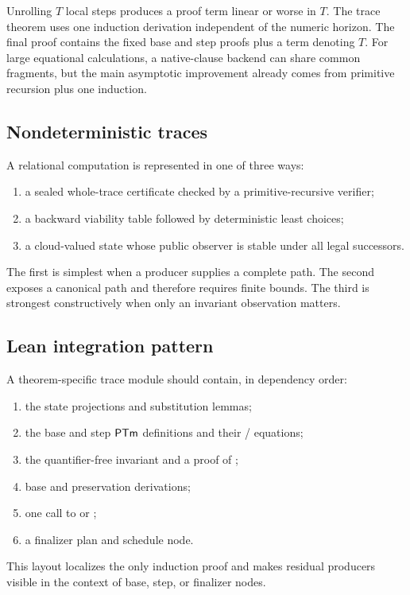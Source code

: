 Unrolling \(T\) local steps produces a proof term linear or worse in \(T\).  The trace theorem uses
one induction derivation independent of the numeric horizon.  The final proof contains the fixed
base and step proofs plus a term denoting \(T\).  For large equational calculations, a native-clause
backend can share common fragments, but the main asymptotic improvement already comes from primitive
recursion plus one induction.

\subsection{Nondeterministic traces}

A relational computation is represented in one of three ways:

\begin{enumerate}
\item a sealed whole-trace certificate checked by a primitive-recursive verifier;
\item a backward viability table followed by deterministic least choices;
\item a cloud-valued state whose public observer is stable under all legal successors.
\end{enumerate}

The first is simplest when a producer supplies a complete path.  The second exposes a canonical path
and therefore requires finite bounds.  The third is strongest constructively when only an invariant
observation matters.

\subsection{Lean integration pattern}

A theorem-specific trace module should contain, in dependency order:

\begin{enumerate}
\item the state projections and substitution lemmas;
\item the base and step \(\mathsf{PTm}\) definitions and their / equations;
\item the quantifier-free invariant and a proof of ;
\item base and preservation derivations;
\item one call to  or ;
\item a finalizer plan and schedule node.
\end{enumerate}

This layout localizes the only induction proof and makes residual producers visible in the context of
base, step, or finalizer nodes.
